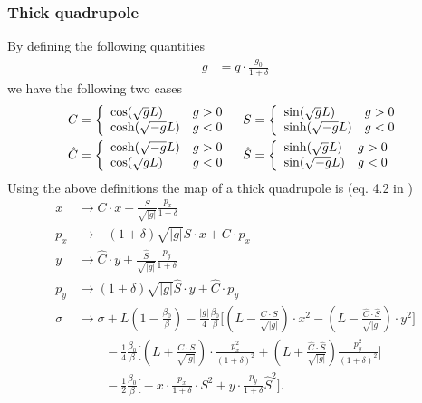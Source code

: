 \documentclass[english]{article}
\begin{document}
\subsubsection{Thick quadrupole}
\noindent By defining the following quantities
\begin{align}
  g &= q \cdot \frac{g_0}{1+\delta}
\end{align}
we have the following two cases
\begin{align}
    C &= \left\{
         \begin{array}{l l}
             \cos(\sqrt{g}L)  & g > 0 \\
             \cosh(\sqrt{-g}L) & g < 0
         \end{array}
         \right. &
    S &= \left\{
         \begin{array}{l l}
             \sin(\sqrt{g}L)  & g > 0 \\
             \sinh(\sqrt{-g}L) & g < 0
         \end{array}
         \right. \\
    \hat{C} &= \left\{
         \begin{array}{l l}
             \cosh(\sqrt{-g}L)  & g > 0 \\
             \cos(\sqrt{g}L) & g < 0
         \end{array}
         \right. &
    \hat{S} &= \left\{
         \begin{array}{l l}
             \sinh(\sqrt{g}L)  & g > 0 \\
             \sin(\sqrt{-g}L) & g < 0
         \end{array}
         \right.
\end{align}
Using the above definitions the map of a thick quadrupole is (eq. 4.2 in \cite{barber87})
\begin{align}
  x   &\to C \cdot x + \frac{S}{\sqrt{|g|}} \frac{p_x}{1+\delta} \\
  p_x &\to - (1+\delta) \sqrt{|g|} S \cdot x + C \cdot p_x \\
  y   &\to \hat C \cdot y + \frac{\hat S}{\sqrt{|g|}} \frac{p_y}{1+\delta} \\
  p_y &\to (1+\delta)\sqrt{|g|} \hat S \cdot y + \hat C \cdot p_y \\
  \sigma &\to \sigma + L \left(1 - \frac{\beta_0}{\beta} \right)
  - \frac{|g|}{4} \frac{\beta_0}{\beta} \Bigg[\left(L-\frac{C\cdot S}{\sqrt{|g|}} \right) \cdot x^2
  - \left(L-\frac{\hat{C}\cdot\hat{S}}{\sqrt{|g|}} \right) \cdot y^2 \Bigg] \\
  & \,\qquad- \frac{1}{4}\frac{\beta_0}{\beta} \Bigg[ \left(L
  + \frac{C\cdot S}{\sqrt{|g|}}\right) \cdot \frac{p_x^2}{(1+\delta)^2}
  + \left(L + \frac{\hat{C}\cdot\hat{S}}{\sqrt{|g|}} \right) \frac{p_y^2}{(1+\delta)^2} \Bigg] \\
  & \,\qquad- \frac{1}{2}\frac{\beta_0}{\beta}\Bigg[-x\cdot\frac{p_x}{1+\delta} \cdot S^2 
  + y\cdot\frac{p_y}{1+\delta} \hat{S}^2 \Bigg].
\end{align}
\end{document}
